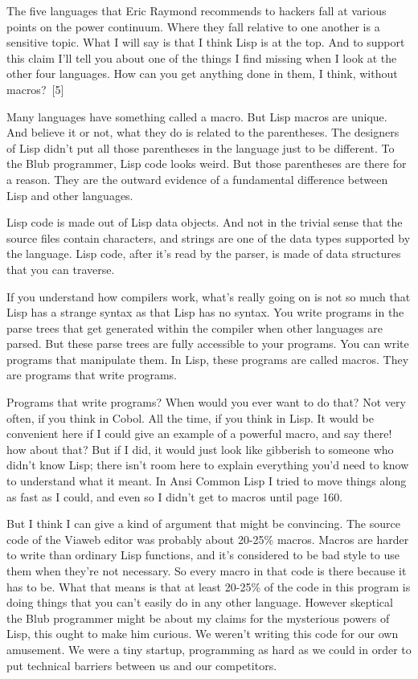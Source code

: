 \documentclass[10pt,twoside,openright]{memoir}
\begin{document}
The five languages that Eric Raymond recommends to hackers fall at various points on the power continuum. Where they fall relative to one another is a sensitive topic. What I will say is that I think Lisp is at the top. And to support this claim I'll tell you about one of the things I find missing when I look at the other four languages. How can you get anything done in them, I think, without macros?~[5]

Many languages have something called a macro. But Lisp macros are unique. And believe it or not, what they do is related to the parentheses. The designers of Lisp didn't put all those parentheses in the language just to be different. To the Blub programmer, Lisp code looks weird. But those parentheses are there for a reason. They are the outward evidence of a fundamental difference between Lisp and other languages.

Lisp code is made out of Lisp data objects. And not in the trivial sense that the source files contain characters, and strings are one of the data types supported by the language. Lisp code, after it's read by the parser, is made of data structures that you can traverse.

If you understand how compilers work, what's really going on is not so much that Lisp has a strange syntax as that Lisp has no syntax. You write programs in the parse trees that get generated within the compiler when other languages are parsed. But these parse trees are fully accessible to your programs. You can write programs that manipulate them. In Lisp, these programs are called macros. They are programs that write programs.

Programs that write programs? When would you ever want to do that? Not very often, if you think in Cobol. All the time, if you think in Lisp. It would be convenient here if I could give an example of a powerful macro, and say there! how about that? But if I did, it would just look like gibberish to someone who didn't know Lisp; there isn't room here to explain everything you'd need to know to understand what it meant. In Ansi Common Lisp I tried to move things along as fast as I could, and even so I didn't get to macros until page 160.

But I think I can give a kind of argument that might be convincing. The source code of the Viaweb editor was probably about 20-25\% macros. Macros are harder to write than ordinary Lisp functions, and it's considered to be bad style to use them when they're not necessary. So every macro in that code is there because it has to be. What that means is that at least 20-25\% of the code in this program is doing things that you can't easily do in any other language. However skeptical the Blub programmer might be about my claims for the mysterious powers of Lisp, this ought to make him curious. We weren't writing this code for our own amusement. We were a tiny startup, programming as hard as we could in order to put technical barriers between us and our competitors.
\end{document}
